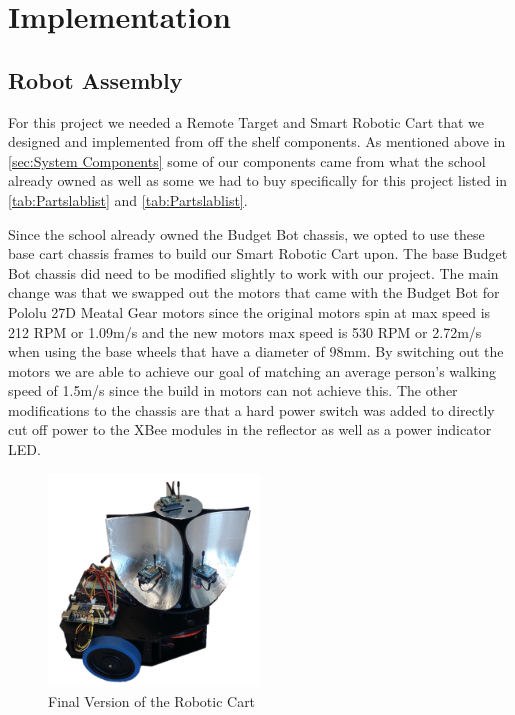 \chapter{Implementation}
\label{ch: Chapter5}

\section{Robot Assembly}

For this project we needed a Remote Target and Smart Robotic Cart that we designed and implemented from off the shelf components.  As mentioned above in \autoref{sec:System Components} some of our components came from what the school already owned as well as some we had to buy specifically for this project listed in \autoref{tab:Partslablist} and \autoref{tab:Partslablist}.\par
Since the school already owned the Budget Bot chassis, we opted to use these base cart chassis frames to build our Smart Robotic Cart upon.  The base Budget Bot chassis did need to be modified slightly to work with our project.  The main change was that we swapped out the motors that came with the Budget Bot for Pololu 27D Meatal Gear motors since the original motors spin at max speed is 212 RPM or 1.09m/s and the new motors max speed is 530 RPM or 2.72m/s when using the base wheels that have a diameter of 98mm.  By switching out the motors we are able to achieve our goal of  matching an average person's walking speed of 1.5m/s since the build in motors can not achieve this. The other modifications to the chassis are that a hard power switch was added to directly cut off power to the XBee modules in the reflector as well as a power indicator LED. \par

\begin{figure}
	\centering
	\includegraphics[width=0.5\textwidth]{figs/img/Finalized_robot.png}
	\caption{Final Version of the Robotic Cart}
 	\label{fig:FinalizedRobot}
\end{figure}


